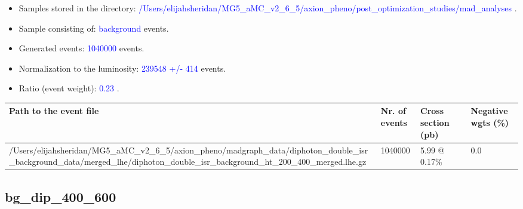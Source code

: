 \documentclass[a4paper, 10pt]{article}
\begin{document}
\begin{itemize}
  \item Samples stored in the directory: \textcolor{blue}{/\-Users/\-elijahsheridan/\-MG5\_aMC\_v2\_6\_5/\-axion\_pheno/\-post\_optimization\_studies/\-mad\_analyses} .
   \item Sample consisting of: \textcolor{blue}{background}  events.
   \item Generated events: \textcolor{blue}{1040000 }  events.
   \item Normalization to the luminosity: \textcolor{blue}{239548}\textcolor{blue}{ +/\-- }\textcolor{blue}{414 }  events.
   \item Ratio (event weight): \textcolor{blue}{0.23 } .  
 
\end{itemize}
\begin{table}[H]
  \begin{center}
    \begin{tabular}{|m{55.0mm}|m{25.0mm}|m{30.0mm}|m{30.0mm}|}
      \hline
      {\cellcolor{yellow}         Path to the event file}& {\cellcolor{yellow}         Nr. of events}& {\cellcolor{yellow}         Cross section (pb)}& {\cellcolor{yellow}         Negative wgts (\%)}\\
      \hline
      {\cellcolor{white}          /\-Users/\-elijahsheridan/\-MG5\_aMC\_v2\_6\_5/\-axion\_pheno/\-madgraph\_data/\-diphoton\_double\_isr\_background\_data/\-merged\_lhe/\-diphoton\_double\_isr\_background\_ht\_200\_400\_merged.lhe.gz}& {\cellcolor{white}          1040000}& {\cellcolor{white}          5.99 @ 0.17\%}& {\cellcolor{white}          0.0}\\
\hline
    \end{tabular}
  \end{center}
\end{table}

\subsection{ bg\_dip\_400\_600}
\end{document}
